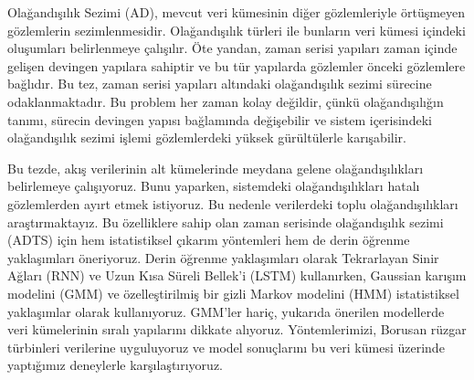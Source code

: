 \documentclass[a4paper,oneside,12pt]{report}
\begin{document}
\begin{ozet}
Olağandışılık Sezimi (AD), mevcut veri kümesinin diğer gözlemleriyle örtüşmeyen gözlemlerin sezimlenmesidir.
Olağandışılık türleri ile bunların veri kümesi içindeki oluşumları belirlenmeye çalışılır.
Öte yandan, zaman serisi yapıları zaman içinde gelişen devingen yapılara sahiptir ve bu tür yapılarda gözlemler önceki gözlemlere bağlıdır.
Bu tez, zaman serisi yapıları altındaki olağandışılık sezimi sürecine odaklanmaktadır.
Bu problem her zaman kolay değildir, çünkü olağandışılığın tanımı, sürecin devingen yapısı bağlamında değişebilir ve sistem içerisindeki olağandışılık sezimi işlemi gözlemlerdeki yüksek gürültülerle karışabilir.

Bu tezde, akış verilerinin alt kümelerinde meydana gelene olağandışılıkları belirlemeye çalışıyoruz.
Bunu yaparken, sistemdeki olağandışılıkları hatalı gözlemlerden ayırt etmek istiyoruz.
Bu nedenle verilerdeki toplu olağandışılıkları araştırmaktayız.
Bu özelliklere sahip olan zaman serisinde olağandışılık sezimi (ADTS) için hem istatistiksel çıkarım yöntemleri hem de derin öğrenme yaklaşımları öneriyoruz.
Derin öğrenme yaklaşımları olarak Tekrarlayan Sinir Ağları (RNN) ve Uzun Kısa Süreli Bellek'i (LSTM) kullanırken, Gaussian karışım modelini (GMM) ve özelleştirilmiş bir gizli Markov modelini (HMM) istatistiksel yaklaşımlar olarak kullanıyoruz.
GMM'ler hariç, yukarıda önerilen modellerde veri kümelerinin sıralı yapılarını dikkate alıyoruz.
Yöntemlerimizi, Borusan rüzgar türbinleri verilerine %
uyguluyoruz ve model sonuçlarını bu veri kümesi üzerinde yaptığımız deneylerle karşılaştırıyoruz.
\end{ozet}

\tableofcontents
\listoffigures
\end{document}
